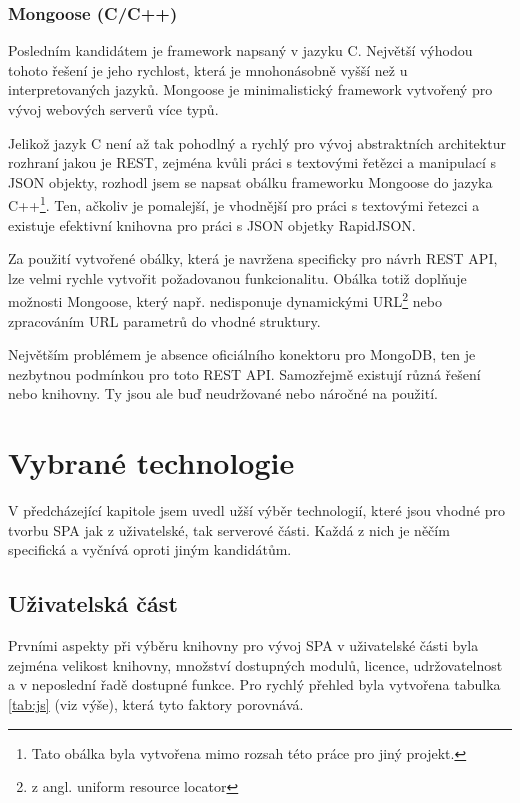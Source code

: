 \subsubsection*{Mongoose (C/C++)}

Posledním kandidátem je framework napsaný v jazyku C. Největší výhodou tohoto řešení je jeho rychlost, která je mnohonásobně vyšší než u interpretovaných jazyků. Mongoose je minimalistický framework vytvořený pro vývoj webových serverů více typů.

Jelikož jazyk C není až tak pohodlný a rychlý pro vývoj abstraktních architektur rozhraní jakou je REST, zejména kvůli práci s textovými řetězci a manipulací s JSON objekty, rozhodl jsem se napsat obálku frameworku Mongoose do jazyka C++\footnote{Tato obálka byla vytvořena mimo rozsah této práce pro jiný projekt.}. Ten, ačkoliv je pomalejší, je vhodnější pro práci s textovými řetezci a existuje efektivní knihovna pro práci s JSON objetky RapidJSON\cite{js:rjson}.

Za použití vytvořené obálky, která je navržena specificky pro návrh REST API, lze velmi rychle vytvořit požadovanou funkcionalitu. Obálka totiž doplňuje možnosti Mongoose, který např. nedisponuje dynamickými URL\footnote{z angl. uniform resource locator} nebo zpracováním URL parametrů do vhodné struktury.

Největším problémem je absence oficiálního konektoru pro MongoDB, ten je nezbytnou podmínkou pro toto REST API. Samozřejmě existují různá řešení nebo knihovny. Ty jsou ale buď neudržované nebo náročné na použití.

\section{Vybrané technologie}

V předcházející kapitole jsem uvedl užší výběr technologií, které jsou vhodné pro tvorbu SPA jak z uživatelské, tak serverové části. Každá z nich je něčím specifická a vyčnívá oproti jiným kandidátům.

\subsection{Uživatelská část}

Prvními aspekty při výběru knihovny pro vývoj SPA v uživatelské části byla zejména velikost knihovny, množství dostupných modulů, licence, udržovatelnost a v neposlední řadě dostupné funkce. Pro rychlý přehled byla vytvořena tabulka \ref{tab:js} (viz výše), která tyto faktory porovnává.


